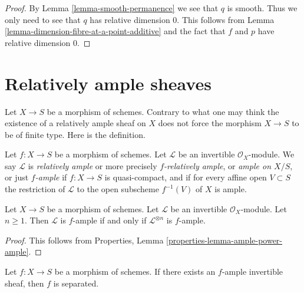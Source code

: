 \begin{proof}
By Lemma \ref{lemma-smooth-permanence} we see that $q$ is smooth.
Thus we only need to see that $q$ has relative dimension $0$.
This follows from Lemma \ref{lemma-dimension-fibre-at-a-point-additive}
and the fact that $f$ and $p$ have relative dimension $0$.
\end{proof}
















\section{Relatively ample sheaves}
\label{section-relatively-ample}

\noindent
Let $X \to S$ be a morphism of schemes.
Contrary to what one may think the existence of a relatively
ample sheaf on $X$ does not force the morphism $X \to S$ to be
of finite type. Here is the definition.

\begin{definition}
\label{definition-relatively-ample}
Let $f : X \to S$ be a morphism of schemes.
Let $\mathcal{L}$ be an invertible $\mathcal{O}_X$-module.
We say $\mathcal{L}$ is {\it relatively ample} or more
precisely {\it $f$-relatively ample}, or
{\it ample on $X/S$}, or just {\it $f$-ample} if $f : X \to S$
is quasi-compact, and if for every affine open $V \subset S$
the restriction of $\mathcal{L}$ to the open subscheme
$f^{-1}(V)$ of $X$ is ample.
\end{definition}

\begin{lemma}
\label{lemma-ample-power-ample}
Let $X \to S$ be a morphism of schemes.
Let $\mathcal{L}$ be an invertible $\mathcal{O}_X$-module.
Let $n \geq 1$. Then $\mathcal{L}$ is $f$-ample if and only if
$\mathcal{L}^{\otimes n}$ is $f$-ample.
\end{lemma}

\begin{proof}
This follows from Properties, Lemma \ref{properties-lemma-ample-power-ample}.
\end{proof}

\begin{lemma}
\label{lemma-relatively-ample-separated}
Let $f : X \to S$ be a morphism of schemes.
If there exists an $f$-ample invertible sheaf, then
$f$ is separated.
\end{lemma}

